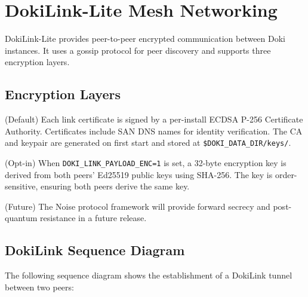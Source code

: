 \section{DokiLink-Lite Mesh Networking}
\label{sec:dokilink}

DokiLink-Lite provides peer-to-peer encrypted communication between
Doki instances. It uses a gossip protocol for peer discovery and
supports three encryption layers.

\subsection{Encryption Layers}
\label{sec:encryption-layers}

\begin{description}[leftmargin=*, style=nextline, font=\sffamily\bfseries]
  \item[L1: TLS 1.3] (Default)
    Each link certificate is signed by a per-install ECDSA P-256
    Certificate Authority. Certificates include SAN DNS names for
    identity verification. The CA and keypair are generated on first
    start and stored at \texttt{\$DOKI\_DATA\_DIR/keys/}.

  \item[L2: NaCl Secretbox] (Opt-in)
    When \texttt{DOKI\_LINK\_PAYLOAD\_ENC=1} is set, a 32-byte
    encryption key is derived from both peers' Ed25519 public keys
    using SHA-256. The key is order-sensitive, ensuring both peers
    derive the same key.

  \item[L3: Noise Protocol] (Future)
    The Noise protocol framework will provide forward secrecy and
    post-quantum resistance in a future release.
\end{description}

\subsection{DokiLink Sequence Diagram}
\label{sec:dokilink-sequence}

The following sequence diagram shows the establishment of a DokiLink
tunnel between two peers:


